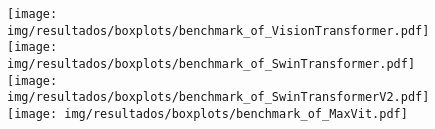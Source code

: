 \begin{figure}[h!]
	\texttt{[image: img/resultados/boxplots/benchmark\_of\_VisionTransformer.pdf]}
	\texttt{[image: img/resultados/boxplots/benchmark\_of\_SwinTransformer.pdf]}
	\texttt{[image: img/resultados/boxplots/benchmark\_of\_SwinTransformerV2.pdf]}
	\texttt{[image: img/resultados/boxplots/benchmark\_of\_MaxVit.pdf]}
	\caption{}
	\label{fig:Time_of_Transformers}
\end{figure}
